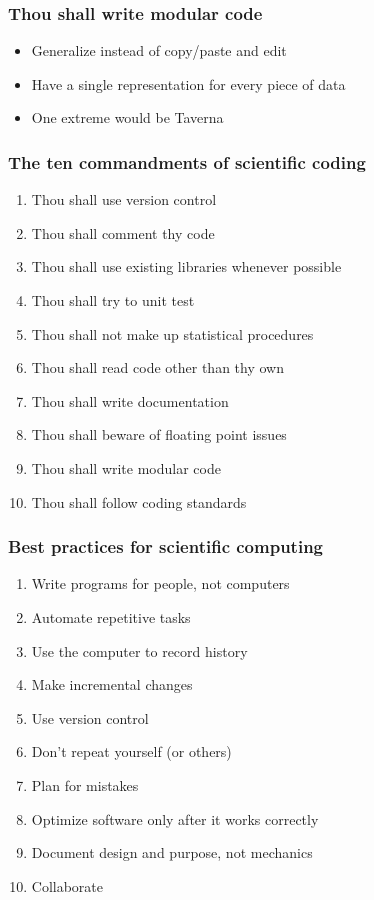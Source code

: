\documentclass[slidestop]{beamer}
\begin{document}
\begin{frame}
  \frametitle{Thou shall write modular code}
  \begin{itemize}
    \item Generalize instead of copy/paste and edit
    \item Have a single representation for every piece of data
    \item One extreme would be Taverna
  \end{itemize}
\end{frame}

\begin{frame}
  \frametitle{The ten commandments of scientific coding}
  \begin{enumerate}
    \item Thou shall use version control
    \item Thou shall comment thy code
    \item Thou shall use existing libraries whenever possible
    \item Thou shall try to unit test
    \item Thou shall not make up statistical procedures
    \item Thou shall read code other than thy own
    \item Thou shall write documentation
    \item Thou shall beware of floating point issues
    \item Thou shall write modular code
    \item Thou shall follow coding standards
  \end{enumerate}
\end{frame}

\begin{frame}
  \frametitle{Best practices for scientific computing}
  \begin{enumerate}
    \item Write programs for people, not computers
    \item Automate repetitive tasks
    \item Use the computer to record history
    \item Make incremental changes
    \item Use version control
    \item Don't repeat yourself (or others)
    \item Plan for mistakes
    \item Optimize software only after it works correctly
    \item Document design and purpose, not mechanics
    \item Collaborate
  \end{enumerate}
\end{frame}
\end{document}
